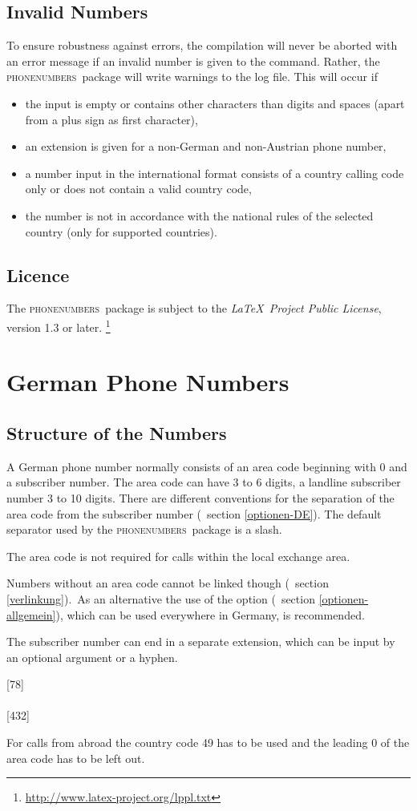 \documentclass[numbers=noenddot]{scrreprt}
\newcommand*{\Paket}[1]{\textsc{#1}}
\newcommand{\phone}{\textcolor{cnltx}{\Paket{phone\-numbers}}}
\newcommand{\UeberschriftAufbau}{\section{Structure of the Numbers}}
\newcommand{\UeberschriftUngueltig}{\section{Invalid Numbers}}
\newcommand{\KeineVerlinkung}{Numbers without an area code cannot be linked though
\vglAbschnitt{verlinkung}.}
\newcommand*{\vglAbschnitt}[1]{(\cf\ section \ref{#1})}
\newcommand*{\AufbauDEATA}[6]{A #1 phone number normally consists of an area code beginning with 0 and a subscriber number. The area code can have #2 to #3 digits, a landline subscriber number #4 to #5 digits. There are different conventions for the separation of the area code from the subscriber number
\vglAbschnitt{#6}.
The default separator used by the \phone\ package is a slash.}
\newcommand{\AufbauDEATB}{The area code is not required for calls within the local exchange area.}
\newcommand{\AufbauDEATC}[1]{\KeineVerlinkung\ As an alternative the use of the \option{home-area-code} option
\vglAbschnitt{optionen-allgemein},
which can be used everywhere in #1, is recommended.\par
The subscriber number can end in a separate extension, which can be input by an optional argument or a hyphen.}
\newcommand*{\AufbauDEATD}[1]{For calls from abroad the country code #1 has to be used and the leading 0 of the area code has to be left out.}
\begin{document}
\UeberschriftUngueltig
To ensure robustness against errors, the compilation will never be aborted with an error message if an invalid number is given to the  command. Rather, the \phone\ package will write warnings to the log file.
This will occur if
\begin{itemize}
\item the input is empty or contains other characters than digits and spaces (apart from a plus sign as first character),
\item an extension is given for a non-German and non-Austrian phone number,
\item a number input in the international format consists of a country calling code only or does not contain a valid country code,
\item the number is not in accordance with the national rules of the selected country (only for supported countries).
\end{itemize}

\section{Licence}
The \phone\ package is subject to the
\emph{\LaTeX\ Project Public License},
version 1.3 or later.%
\footnote{\url{http://www.latex-project.org/lppl.txt}}

\chapter{German Phone Numbers}
\UeberschriftAufbau
\AufbauDEATA{German}{3}{6}{3}{10}{optionen-DE}
\begin{sidebyside}
\end{sidebyside}

\AufbauDEATB
\begin{sidebyside}
\end{sidebyside}
\AufbauDEATC{Germany}
\begin{sidebyside}
  [78] \\
   \\
  [432] \\
\end{sidebyside}

\AufbauDEATD{49}
\begin{sidebyside}
\end{sidebyside}
\end{document}
